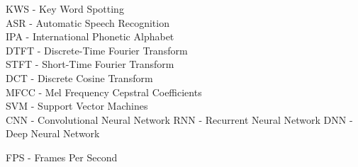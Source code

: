 
KWS - Key Word Spotting\\
ASR - Automatic Speech Recognition\\
IPA - International Phonetic Alphabet\\

DTFT - Discrete-Time Fourier Transform\\
STFT - Short-Time Fourier Transform\\
DCT - Discrete Cosine Transform\\
MFCC - Mel Frequency Cepstral Coefficients\\

SVM - Support Vector Machines\\

CNN - Convolutional Neural Network
RNN - Recurrent Neural Network
DNN - Deep Neural Network

FPS - Frames Per Second\\